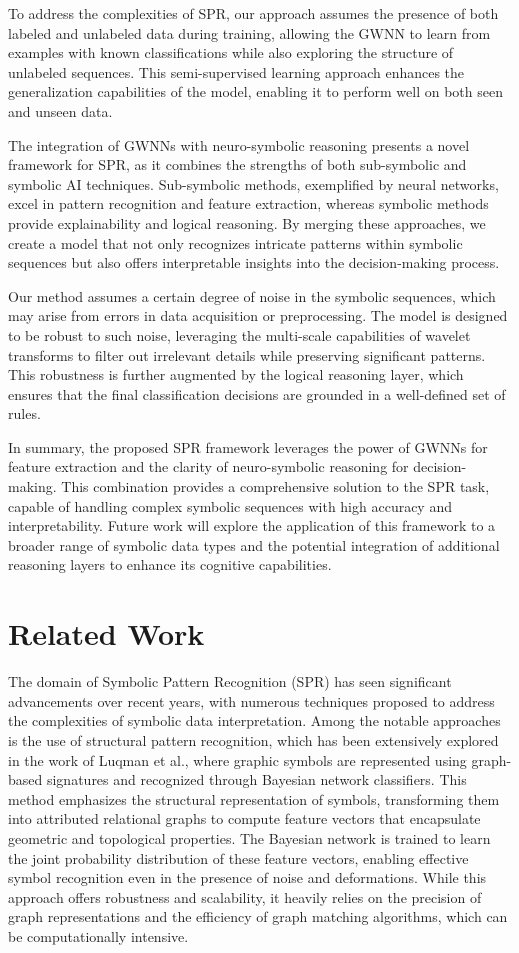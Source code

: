 \documentclass{article}
\begin{document}
To address the complexities of SPR, our approach assumes the presence of both labeled and unlabeled data during training, allowing the GWNN to learn from examples with known classifications while also exploring the structure of unlabeled sequences. This semi-supervised learning approach enhances the generalization capabilities of the model, enabling it to perform well on both seen and unseen data.

The integration of GWNNs with neuro-symbolic reasoning presents a novel framework for SPR, as it combines the strengths of both sub-symbolic and symbolic AI techniques. Sub-symbolic methods, exemplified by neural networks, excel in pattern recognition and feature extraction, whereas symbolic methods provide explainability and logical reasoning. By merging these approaches, we create a model that not only recognizes intricate patterns within symbolic sequences but also offers interpretable insights into the decision-making process.

Our method assumes a certain degree of noise in the symbolic sequences, which may arise from errors in data acquisition or preprocessing. The model is designed to be robust to such noise, leveraging the multi-scale capabilities of wavelet transforms to filter out irrelevant details while preserving significant patterns. This robustness is further augmented by the logical reasoning layer, which ensures that the final classification decisions are grounded in a well-defined set of rules.

In summary, the proposed SPR framework leverages the power of GWNNs for feature extraction and the clarity of neuro-symbolic reasoning for decision-making. This combination provides a comprehensive solution to the SPR task, capable of handling complex symbolic sequences with high accuracy and interpretability. Future work will explore the application of this framework to a broader range of symbolic data types and the potential integration of additional reasoning layers to enhance its cognitive capabilities.

\section{Related Work}
The domain of Symbolic Pattern Recognition (SPR) has seen significant advancements over recent years, with numerous techniques proposed to address the complexities of symbolic data interpretation. Among the notable approaches is the use of structural pattern recognition, which has been extensively explored in the work of Luqman et al., where graphic symbols are represented using graph-based signatures and recognized through Bayesian network classifiers. This method emphasizes the structural representation of symbols, transforming them into attributed relational graphs to compute feature vectors that encapsulate geometric and topological properties. The Bayesian network is trained to learn the joint probability distribution of these feature vectors, enabling effective symbol recognition even in the presence of noise and deformations. While this approach offers robustness and scalability, it heavily relies on the precision of graph representations and the efficiency of graph matching algorithms, which can be computationally intensive.
\end{document}
